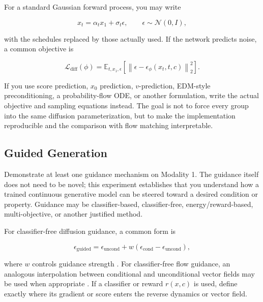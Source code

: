 \documentclass{article}
\begin{document}
For a standard Gaussian forward process, you may write

\begin{equation}
    x_t = \alpha_t x_1 + \sigma_t \epsilon,
    \qquad
    \epsilon \sim \mathcal{N}(0,I),
\end{equation}

with the schedules replaced by those actually used. If the network predicts noise, a common objective is

\begin{equation}
\mathcal{L}_{\mathrm{diff}}(\phi)
=
\mathbb{E}_{t,x_1,\epsilon}
\left[
\left\|
\epsilon-\epsilon_{\phi}(x_t,t,c)
\right\|_2^2
\right].
\end{equation}

If you use score prediction, $x_0$ prediction, $v$-prediction, EDM-style preconditioning, a probability-flow ODE, or another formulation, write the actual objective and sampling equations instead. The goal is not to force every group into the same diffusion parameterization, but to make the implementation reproducible and the comparison with flow matching interpretable.

\subsection{Guided Generation}

Demonstrate at least one guidance mechanism on Modality 1. The guidance itself does not need to be novel; this experiment establishes that you understand how a trained continuous generative model can be steered toward a desired condition or property. Guidance may be classifier-based, classifier-free, energy/reward-based, multi-objective, or another justified method.

For classifier-free diffusion guidance, a common form is

\begin{equation}
\epsilon_{\mathrm{guided}}
=
\epsilon_{\mathrm{uncond}}
+
 w\left(
 \epsilon_{\mathrm{cond}}-\epsilon_{\mathrm{uncond}}
\right),
\end{equation}

where $w$ controls guidance strength \citep{ho2022classifier}. For classifier-free flow guidance, an analogous interpolation between conditional and unconditional vector fields may be used when appropriate \citep{zheng2023guided}. If a classifier or reward $r(x,c)$ is used, define exactly where its gradient or score enters the reverse dynamics or vector field.
\end{document}
